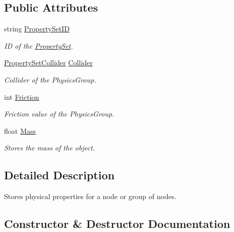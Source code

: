 \subsection*{Public Attributes}
\begin{DoxyCompactItemize}
\item 
string \hyperlink{struct_property_set_a8366cd9dd1ed6a6fccb6746f9e69e885}{Property\+Set\+ID}
\begin{DoxyCompactList}\small\item\em ID of the \hyperlink{struct_property_set}{Property\+Set}. \end{DoxyCompactList}\item 
\hyperlink{class_property_set_1_1_property_set_collider}{Property\+Set\+Collider} \hyperlink{struct_property_set_a0753ed952f5d39ee1a32abb276a79be2}{Collider}
\begin{DoxyCompactList}\small\item\em Collider of the Physics\+Group. \end{DoxyCompactList}\item 
int \hyperlink{struct_property_set_a4156108efef99bed9a69761482e9cb2f}{Friction}
\begin{DoxyCompactList}\small\item\em Friction value of the Physics\+Group. \end{DoxyCompactList}\item 
float \hyperlink{struct_property_set_a39e7117921eaa970b4d6e4aeb19fd653}{Mass}
\begin{DoxyCompactList}\small\item\em Stores the mass of the object. \end{DoxyCompactList}\end{DoxyCompactItemize}


\subsection{Detailed Description}
Stores physical properties for a node or group of nodes. 



\subsection{Constructor \& Destructor Documentation}
\mbox{\label{struct_property_set_a428033b47a1de1ccf9bf9ef1d14359ed}} 
